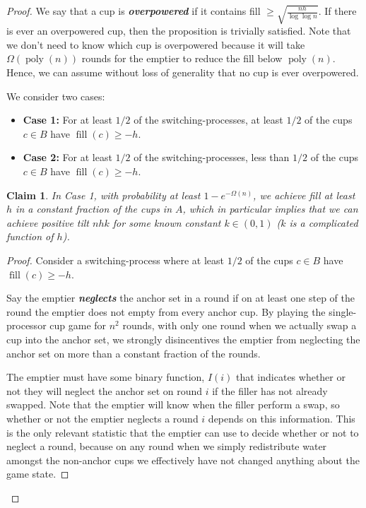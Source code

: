 \documentclass[twocolumn]{article}[11pt]
\newcommand{\defn}[1]{{\textit{\textbf{\boldmath #1}}}}
\DeclareMathOperator{\poly}{\text{poly}}
\DeclareMathOperator{\fil}{\text{fill}}
\newtheorem{clm}{Claim}
\begin{document}
\begin{proof}
We say that a cup is \defn{overpowered} if it contains fill $\ge
\sqrt{\frac{nh}{\log\log n}}$. If there is ever an overpowered cup, then the
proposition is trivially satisfied. Note that we don't need to know which cup
is overpowered because it will take $\Omega(\poly(n))$ rounds for the emptier
to reduce the fill below $\poly(n)$. Hence, we can assume without loss
of generality that no cup is ever overpowered.

We consider two cases:
\begin{itemize}
  \item \textbf{Case 1:} For at least $1/2$ of the switching-processes, at
    least $1/2$ of the cups $c \in B$ have $\fil(c) \ge -h$.
  \item \textbf{Case 2:} For at least $1/2$ of the switching-processes, less
    than $1/2$ of the cups $c \in B$ have $\fil(c) \ge -h$.
\end{itemize}

\begin{clm}
  \label{clm:reg} In Case 1, with probability at least $1-e^{-\Omega(n)}$, we
  achieve fill at least $h$ in a constant fraction of the cups in $A$, which in
  particular implies that we can achieve positive tilt $nhk$ for some known
  constant $k \in (0,1)$ ($k$ is a complicated function of $h$).
\end{clm}
\begin{proof}
  Consider a switching-process where at least $1/2$ of the cups $c \in B$
  have $\fil(c) \ge -h$.

  Say the emptier \defn{neglects} the anchor set in a round if on at least one
  step of the round the emptier does not empty from every anchor cup. By
  playing the single-processor cup game for $n^2$ rounds, with only one round
  when we actually swap a cup into the anchor set, we strongly disincentives
  the emptier from neglecting the anchor set on more than a constant fraction
  of the rounds. 

  The emptier must have some binary function, $I(i)$ that indicates whether or
  not they will neglect the anchor set on round $i$ if the filler has not already
  swapped. Note that the emptier will know when the filler perform a swap, so
  whether or not the emptier neglects a round $i$ depends on this information.
  This is the only relevant statistic that the emptier can use to decide
  whether or not to neglect a round, because on any round when we simply
  redistribute water amongst the non-anchor cups we effectively have not
  changed anything about the game state. 


\end{proof}
\end{proof}
\end{document}
